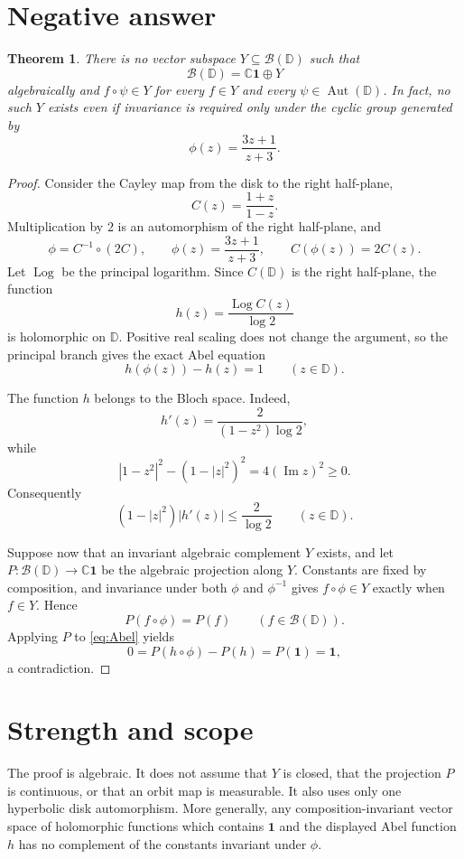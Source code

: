 \documentclass[11pt]{article}
\newtheorem{theorem}{Theorem}
\newcommand{\D}{\mathbb D}
\newcommand{\B}{\mathcal B}
\newcommand{\C}{\mathbb C}
\newcommand{\Aut}{\operatorname{Aut}}
\begin{document}
\section{Negative answer}

\begin{theorem}
There is no vector subspace $Y\subseteq\B(\D)$ such that
\[
 \B(\D)=\C\mathbf 1\oplus Y
\]
algebraically and $f\circ\psi\in Y$ for every $f\in Y$ and every
$\psi\in\Aut(\D)$.  In fact, no such $Y$ exists even if invariance is
required only under the cyclic group generated by
\[
 \phi(z)=\frac{3z+1}{z+3}.
\]
\end{theorem}

\begin{proof}
Consider the Cayley map from the disk to the right half-plane,
\[
 C(z)=\frac{1+z}{1-z}.
\]
Multiplication by $2$ is an automorphism of the right half-plane, and
\[
 \phi=C^{-1}\circ(2C),\qquad
 \phi(z)=\frac{3z+1}{z+3},\qquad C(\phi(z))=2C(z).
\]
Let $\operatorname{Log}$ be the principal logarithm.  Since $C(\D)$ is the
right half-plane, the function
\[
 h(z)=\frac{\operatorname{Log}C(z)}{\log 2}
\]
is holomorphic on $\D$.  Positive real scaling does not change the argument,
so the principal branch gives the exact Abel equation
\begin{equation}\label{eq:Abel}
 h(\phi(z))-h(z)=1\qquad(z\in\D).
\end{equation}

The function $h$ belongs to the Bloch space.  Indeed,
\[
 h'(z)=\frac{2}{(1-z^2)\log 2},
\]
while
\[
 |1-z^2|^2-(1-|z|^2)^2=4(\operatorname{Im}z)^2\ge0.
\]
Consequently
\[
 (1-|z|^2)|h'(z)|\le \frac{2}{\log 2}
 \qquad(z\in\D).
\]

Suppose now that an invariant algebraic complement $Y$ exists, and let
$P:\B(\D)\to\C\mathbf1$ be the algebraic projection along $Y$.  Constants
are fixed by composition, and invariance under both $\phi$ and $\phi^{-1}$
gives $f\circ\phi\in Y$ exactly when $f\in Y$.  Hence
\[
 P(f\circ\phi)=P(f)\qquad(f\in\B(\D)).
\]
Applying $P$ to \eqref{eq:Abel} yields
\[
 0=P(h\circ\phi)-P(h)=P(\mathbf1)=\mathbf1,
\]
a contradiction.
\end{proof}

\section{Strength and scope}

The proof is algebraic.  It does not assume that $Y$ is closed, that the
projection $P$ is continuous, or that an orbit map is measurable.  It also
uses only one hyperbolic disk automorphism.  More generally, any
composition-invariant vector space of holomorphic functions which contains
$\mathbf1$ and the displayed Abel function $h$ has no complement of the
constants invariant under $\phi$.
\end{document}

